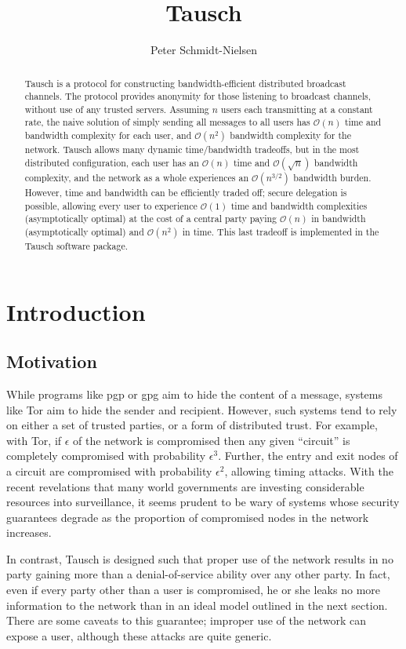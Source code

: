 \documentclass[12pt]{article}
\author{Peter Schmidt-Nielsen}
\title{Tausch}
\begin{document}
\maketitle
\begin{abstract}
Tausch is a protocol for constructing bandwidth-efficient distributed broadcast channels.
The protocol provides anonymity for those listening to broadcast channels, without use of any trusted servers.
Assuming $n$ users each transmitting at a constant rate, the naive solution of simply sending all messages to all users has $\mathcal{O}(n)$ time and bandwidth complexity for each user, and $\mathcal{O}(n^2)$ bandwidth complexity for the network.
Tausch allows many dynamic time/bandwidth tradeoffs, but in the most distributed configuration, each user has an $\mathcal{O}(n)$ time and $\mathcal{O}(\sqrt{n})$ bandwidth complexity, and the network as a whole experiences an $\mathcal{O}(n^{3/2})$ bandwidth burden.
However, time and bandwidth can be efficiently traded off; secure delegation is possible, allowing every user to experience $\mathcal{O}(1)$ time and bandwidth complexities (asymptotically optimal) at the cost of a central party paying $\mathcal{O}(n)$ in bandwidth (asymptotically optimal) and $\mathcal{O}(n^2)$ in time.
This last tradeoff is implemented in the Tausch software package.
\end{abstract}

\section{Introduction}
\subsection{Motivation}
While programs like pgp or gpg aim to hide the content of a message, systems like Tor aim to hide the sender and recipient.
However, such systems tend to rely on either a set of trusted parties, or a form of distributed trust.
For example, with Tor, if $\epsilon$ of the network is compromised then any given ``circuit'' is completely compromised with probability $\epsilon^3$.
Further, the entry and exit nodes of a circuit are compromised with probability $\epsilon^2$, allowing timing attacks.
With the recent revelations that many world governments are investing considerable resources into surveillance, it seems prudent to be wary of systems whose security guarantees degrade as the proportion of compromised nodes in the network increases.

In contrast, Tausch is designed such that proper use of the network results in no party gaining more than a denial-of-service ability over any other party.
In fact, even if every party other than a user is compromised, he or she leaks no more information to the network than in an ideal model outlined in the next section.
There are some caveats to this guarantee; improper use of the network can expose a user, although these attacks are quite generic.
\end{document}
